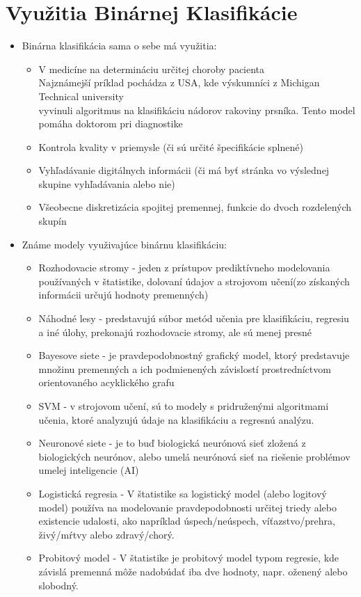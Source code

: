 \documentclass{article}
\begin{document}
\section{Využitia Binárnej Klasifikácie}
\begin{itemize}    
\item Binárna klasifikácia sama o sebe má využitia:
    \begin{itemize}
        \item V medicíne na determináciu určitej choroby pacienta \\
        Najznámejší príklad pochádza z USA, kde výskumníci z Michigan Technical university\\vyvinuli algoritmus na klasifikáciu nádorov rakoviny prsníka. Tento model pomáha doktorom pri diagnostike
        \item Kontrola kvality v priemysle (či sú určité špecifikácie splnené)
        \item Vyhľadávanie digitálnych informácii (či má byť stránka vo výslednej skupine vyhľadávania alebo nie)
        \item Všeobecne diskretizácia spojitej premennej, funkcie do dvoch rozdelených skupín
    \end{itemize}
    \item Známe modely využivajúce binárnu klasifikáciu:
        \begin{itemize}
            \item Rozhodovacie stromy - jeden z prístupov prediktívneho modelovania používaných v štatistike, dolovaní údajov a strojovom učení(zo získaných informácii určujú hodnoty premenných)
            \item Náhodné lesy - predstavujú súbor metód učenia pre klasifikáciu, regresiu a iné úlohy, prekonajú rozhodovacie stromy, ale sú menej presné
            \item Bayesove siete - je pravdepodobnostný grafický model, ktorý predstavuje množinu premenných a ich podmienených závislostí prostredníctvom orientovaného acyklického grafu
            \item SVM - v strojovom učení, sú to modely s pridruženými algoritmami učenia, ktoré analyzujú údaje na klasifikáciu a regresnú analýzu.
            \item Neuronové siete - je to buď biologická neurónová sieť zložená z biologických neurónov, alebo umelá neurónová sieť na riešenie problémov umelej inteligencie (AI)
            \item Logistická regresia - V štatistike sa logistický model (alebo logitový model) používa na modelovanie pravdepodobnosti určitej triedy alebo existencie udalosti, ako napríklad úspech/neúspech, víťazstvo/prehra, živý/mŕtvy alebo zdravý/chorý.
            \item Probitový model - V štatistike je probitový model typom regresie, kde závislá premenná môže nadobúdať iba dve hodnoty, napr. oženený alebo slobodný.
            

\end{itemize}
\end{itemize}
\end{document}
